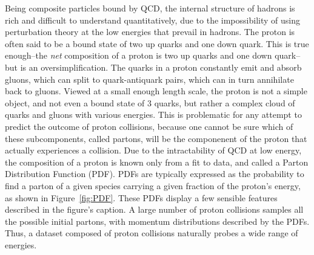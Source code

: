   Being composite particles bound by QCD, the internal structure of hadrons is rich and difficult to understand quantitatively, due to the impossibility of using perturbation theory at the low energies that prevail in hadrons.
  The proton is often said to be a bound state of two up quarks and one down quark.
  This is true enough--the {\it net} composition of a proton is two up quarks and one down quark--but is an oversimplification.
  The quarks in a proton constantly emit and absorb gluons, which can split to quark-antiquark pairs, which can in turn annihilate back to gluons.
  Viewed at a small enough length scale, the proton is not a simple object, and not even a bound state of 3 quarks, but rather a complex cloud of quarks and gluons with various energies.
  This is problematic for any attempt to predict the outcome of proton collisions, because one cannot be sure which of these subcomponents, called partons, will be the componenent of the proton that actually experiences a collision.
  Due to the intractability of QCD at low energy, the composition of a proton is known only from a fit to data, and called a Parton Distribution Function (PDF).
  PDFs are typically expressed as the probability to find a parton of a given species carrying a given fraction of the proton's energy, as shown in Figure~\ref{fig:PDF}.
  These PDFs display a few sensible features described in the figure's caption.
  A large number of proton collisions samples all the possible initial partons, with momentum distributions described by the PDFs.
  Thus, a dataset composed of proton collisions naturally probes a wide range of energies.


